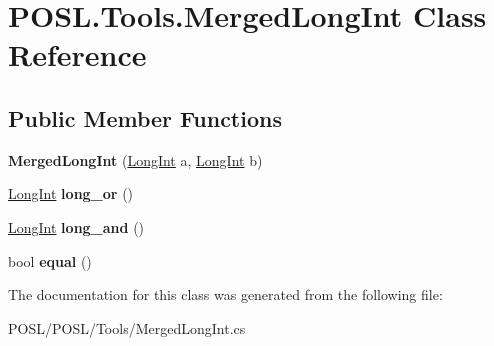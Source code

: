 \hypertarget{classPOSL_1_1Tools_1_1MergedLongInt}{}\section{P\+O\+S\+L.\+Tools.\+Merged\+Long\+Int Class Reference}
\label{classPOSL_1_1Tools_1_1MergedLongInt}
\subsection*{Public Member Functions}
\begin{DoxyCompactItemize}
\item 
\mbox{\label{classPOSL_1_1Tools_1_1MergedLongInt_a6cdab3ec6127896daedcff94924458b6}} 
{\bfseries Merged\+Long\+Int} (\hyperlink{classPOSL_1_1Tools_1_1LongInt}{Long\+Int} a, \hyperlink{classPOSL_1_1Tools_1_1LongInt}{Long\+Int} b)
\item 
\mbox{\label{classPOSL_1_1Tools_1_1MergedLongInt_a77ab115b2e737b5e9aa529af4044288e}} 
\hyperlink{classPOSL_1_1Tools_1_1LongInt}{Long\+Int} {\bfseries long\+\_\+or} ()
\item 
\mbox{\label{classPOSL_1_1Tools_1_1MergedLongInt_a543d8d87cdf103243867254b521773f7}} 
\hyperlink{classPOSL_1_1Tools_1_1LongInt}{Long\+Int} {\bfseries long\+\_\+and} ()
\item 
\mbox{\label{classPOSL_1_1Tools_1_1MergedLongInt_a3b6ce587c0f502e9d4ef7d28066027c9}} 
bool {\bfseries equal} ()
\end{DoxyCompactItemize}


The documentation for this class was generated from the following file\+:\begin{DoxyCompactItemize}
\item 
P\+O\+S\+L/\+P\+O\+S\+L/\+Tools/Merged\+Long\+Int.\+cs\end{DoxyCompactItemize}
